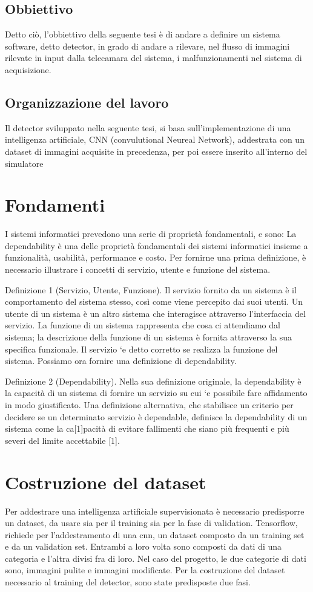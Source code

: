 \documentclass[14pt]{extarticle}
\begin{document}
\subsection{Obbiettivo}
Detto ciò, l'obbiettivo della seguente tesi è di andare a definire un sistema software, detto detector, in grado di andare a rilevare, nel flusso di immagini rilevate in input dalla telecamara del sistema, i malfunzionamenti nel sistema di acquisizione. 
\subsection{Organizzazione del lavoro} 
Il detector sviluppato nella seguente tesi, si basa sull'implementazione di una intelligenza artificiale, CNN (convulutional Neureal Network), addestrata con un dataset di immagini acquisite in  precedenza, per poi essere inserito all'interno del simulatore
\section{Fondamenti}
I sistemi informatici prevedono una serie di proprietà fondamentali, e sono:
La dependability è una delle proprietà fondamentali dei sistemi informatici insieme a funzionalità, usabilità, performance e costo. Per fornirne una prima definizione, è necessario illustrare i concetti di servizio, utente e funzione del sistema.

Definizione 1 (Servizio, Utente, Funzione). Il servizio fornito da un sistema
è il comportamento del sistema stesso, così come viene percepito dai suoi utenti.
Un utente di un sistema è un altro sistema che interagisce attraverso l’interfaccia del
servizio. La funzione di un sistema rappresenta che cosa ci attendiamo dal sistema; la
descrizione della funzione di un sistema è fornita attraverso la sua specifica funzionale.
Il servizio `e detto corretto se realizza la funzione del sistema. 
Possiamo ora fornire una definizione di dependability.

Definizione 2 (Dependability). Nella sua definizione originale, la dependability è
la capacità di un sistema di fornire un servizio su cui `e possibile fare affidamento in
modo giustificato. 
Una definizione alternativa, che stabilisce un criterio per decidere se un
determinato servizio è dependable, definisce la dependability di un sistema
come la ca[1]pacità di evitare fallimenti che siano più frequenti e più severi del
limite accettabile [1].

\section{Costruzione del dataset}
Per addestrare una intelligenza artificiale supervisionata è necessario predisporre un dataset, da usare sia per il training sia per la fase di validation.
Tensorflow, richiede per l'addestramento di una cnn, un dataset composto da un training set e da un validation set. Entrambi a loro volta sono composti da dati di una categoria e l'altra divisi fra di loro. Nel caso del progetto, le due categorie di dati sono, immagini pulite e immagini modificate.
Per la costruzione del dataset necessario al training del detector, sono state predisposte due fasi.
\end{document}
